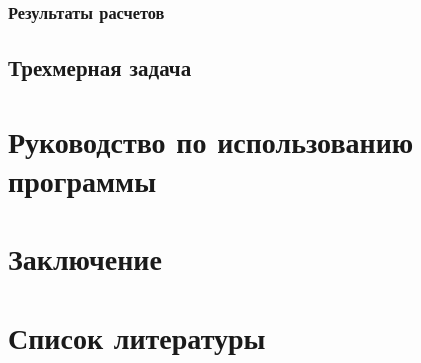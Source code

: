 \documentclass[12pt,a4paper, titlepage, openany]{book}
\begin{document}
\subsection{Результаты расчетов}

\section{Трехмерная задача}

\chapter{Руководство по использованию программы}

\chapter{Заключение}

\chapter{Список литературы}
\end{document}
